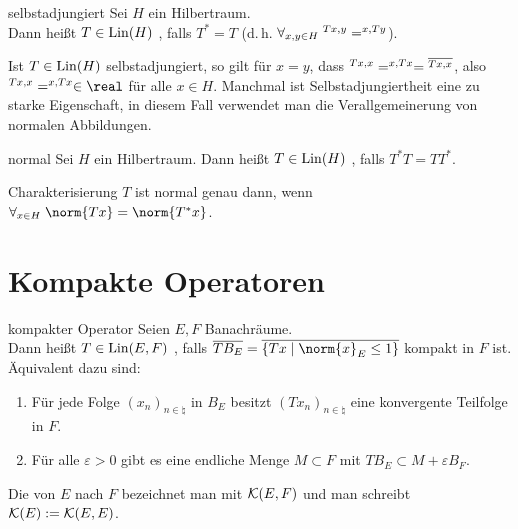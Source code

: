 \linie

\begin{Def}{selbstadjungiert}
    Sei $H$ ein Hilbertraum.\\
    Dann heißt $T \in \operatorname{Lin}(H)$ , falls $T^\ast = T$
    (d.\,h. $\forall_{x, y \in H}\; \sp{Tx, y} = \sp{x, Ty}$).
\end{Def}

\begin{Bem}
    Ist $T \in \operatorname{Lin}(H)$ selbstadjungiert, so gilt für $x = y$, dass
    $\sp{Tx, x} = \sp{x, Tx} = \overline{\sp{Tx, x}}$,
    also $\sp{Tx, x} = \sp{x, Tx} \in \real$ für alle $x \in H$.
    Manchmal ist Selbstadjungiertheit eine zu starke Eigenschaft,
    in diesem Fall verwendet man die Verallgemeinerung von normalen Abbildungen.
\end{Bem}

\begin{Def}{normal}
    Sei $H$ ein Hilbertraum.
    Dann heißt $T \in \operatorname{Lin}(H)$ , falls $T^\ast T = TT^\ast$.
\end{Def}

\begin{Lemma}{Charakterisierung}
    $T$ ist normal genau dann, wenn
    $\forall_{x \in H}\; \norm{Tx} = \norm{T^\ast x}$.
\end{Lemma}

\pagebreak

\section{%
    Kompakte Operatoren%
}

\begin{Def}{kompakter Operator}
    Seien $E, F$ Banachräume.\\
    Dann heißt $T \in \operatorname{Lin}(E, F)$ , falls
    $\overline{T B_E} = \overline{\{Tx \;|\; \norm{x}_E \le 1\}}$ kompakt in $F$ ist.\\
    Äquivalent dazu sind:
    \begin{enumerate}
        \item
        Für jede Folge $(x_n)_{n \in \natural}$ in $B_E$ besitzt $(Tx_n)_{n \in \natural}$
        eine konvergente Teilfolge in $F$.

        \item
        Für alle $\varepsilon > 0$ gibt es eine endliche Menge $M \subset F$ mit
        $TB_E \subset M + \varepsilon B_F$.
    \end{enumerate}
    Die  von $E$ nach $F$ bezeichnet man mit
    $\mathcal{K}(E, F)$ und man schreibt $\mathcal{K}(E) := \mathcal{K}(E, E)$.
\end{Def}

